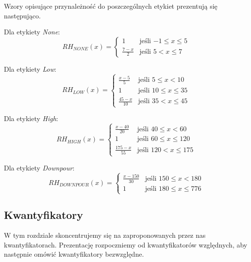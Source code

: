 \documentclass{classrep}
\begin{document}
Wzory opisujące przynależność do poszczególnych etykiet prezentują się następująco. \newline

Dla etykiety \textit{None}:
\begin{equation}
{RH}_{NONE}(x)= \left\{ \begin{array}{ll}
1 			& \textrm{jeśli $-1 \leq x \leq 5$} \\
\frac{7-x}{2} 	& \textrm{jeśli $5 < x \leq 7$}
\end{array} \right.
\end{equation}

Dla etykiety \textit{Low}:
\begin{equation}
{RH}_{LOW}(x)= \left\{ \begin{array}{ll}
\frac{x-5}{5} 	& \textrm{jeśli $5 \leq x < 10$} \\
1 			& \textrm{jeśli $10 \leq x \leq 35$} \\
\frac{45-x}{10} 	& \textrm{jeśli $35 < x \leq 45$}
\end{array} \right.
\end{equation}

Dla etykiety \textit{High}:
\begin{equation}
{RH}_{HIGH}(x)= \left\{ \begin{array}{ll}
\frac{x-40}{20} 	& \textrm{jeśli $40 \leq x < 60$} \\
1 			& \textrm{jeśli $60 \leq x \leq 120$} \\
\frac{175-x}{55} 	& \textrm{jeśli $120 < x \leq 175$}
\end{array} \right.
\end{equation}

Dla etykiety \textit{Downpour}:
\begin{equation}
{RH}_{DOWNPOUR}(x)= \left\{ \begin{array}{ll}
\frac{x-150}{30} 	 & \textrm{jeśli $150 \leq x < 180$} \\
1 			 & \textrm{jeśli $180 \leq x \leq 776$}
\end{array} \right.
\end{equation}
\clearpage




\subsection{Kwantyfikatory}
W tym rozdziale skoncentrujemy się na zaproponowanych przez nas kwantyfikatorach. Prezentację rozpoczniemy od kwantyfikatorów względnych, aby następnie omówić kwantyfikatory bezwzględne.\newline
\end{document}
